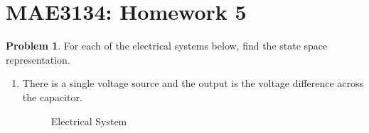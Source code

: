 \documentclass[10pt]{article}
\date{}
\theoremstyle{definition}
\newtheorem{prob}{Problem}[section]
\newenvironment{subprob}%
{\renewcommand{\theenumi}{\alph{enumi}}\renewcommand{\labelenumi}{(\theenumi)}\begin{enumerate}}%
{\end{enumerate}}%
\begin{document}
\pagestyle{empty}
\section*{MAE3134: Homework 5}
\vspace*{-0.4cm}

\begin{prob}
    For each of the electrical systems below, find the state space representation.
    \begin{subprob}
    \item There is a single voltage source and the output is the voltage difference across the capacitor.
        \begin{figure}[h]
            \centering
            \begin{scaletikzpicturetowidth}{0.8\textwidth}
            \end{scaletikzpicturetowidth}

            \caption{Electrical System}
        \end{figure}


\end{subprob}
\end{prob}
\end{document}
